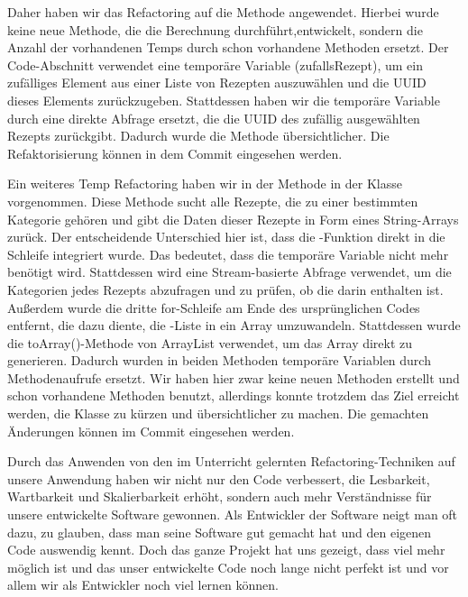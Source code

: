 Daher haben wir das Refactoring auf die Methode  angewendet. Hierbei wurde keine neue Methode, die die Berechnung durchführt,entwickelt, sondern die Anzahl der vorhandenen Temps durch schon vorhandene Methoden ersetzt. Der Code-Abschnitt verwendet eine temporäre Variable (zufallsRezept), um ein zufälliges Element aus einer Liste von Rezepten auszuwählen und die UUID dieses Elements zurückzugeben. Stattdessen haben wir die temporäre Variable durch eine direkte Abfrage ersetzt, die die UUID des zufällig ausgewählten Rezepts zurückgibt. Dadurch wurde die Methode übersichtlicher. Die Refaktorisierung können in dem Commit \href{https://github.com/MichaelaHaag/RezeptApp/commit/4e0bedc859ba644d448fe4c89a3a6e1320519593}{} eingesehen werden. 

Ein weiteres Temp Refactoring haben wir in der Methode  in der Klasse  vorgenommen. Diese Methode sucht alle Rezepte, die zu einer bestimmten Kategorie gehören und gibt die Daten dieser Rezepte in Form eines String-Arrays zurück. Der entscheidende Unterschied hier ist, dass die -Funktion direkt in die Schleife integriert wurde. Das bedeutet, dass die temporäre Variable  nicht mehr benötigt wird. Stattdessen wird eine Stream-basierte Abfrage verwendet, um die Kategorien jedes Rezepts abzufragen und zu prüfen, ob die  darin enthalten ist.
Außerdem wurde die dritte for-Schleife am Ende des ursprünglichen Codes entfernt, die dazu diente, die -Liste in ein Array umzuwandeln. Stattdessen wurde die toArray()-Methode von ArrayList verwendet, um das Array direkt zu generieren. 
Dadurch wurden in beiden Methoden temporäre Variablen durch Methodenaufrufe ersetzt. Wir haben hier zwar keine neuen Methoden erstellt und schon vorhandene Methoden benutzt, allerdings konnte trotzdem das Ziel erreicht werden, die Klasse zu kürzen und übersichtlicher zu machen. Die gemachten Änderungen können im Commit \href{https://github.com/MichaelaHaag/RezeptApp/commit/4e0bedc859ba644d448fe4c89a3a6e1320519593}{} eingesehen werden. 

Durch das Anwenden von den im Unterricht gelernten Refactoring-Techniken auf unsere Anwendung haben wir nicht nur den Code verbessert, die Lesbarkeit, Wartbarkeit und Skalierbarkeit erhöht, sondern auch mehr Verständnisse für unsere entwickelte Software gewonnen. Als Entwickler der Software neigt man oft dazu, zu glauben, dass man seine Software gut gemacht hat und den eigenen Code auswendig kennt. Doch das ganze Projekt hat uns gezeigt, dass viel mehr möglich ist und das unser entwickelte Code noch lange nicht perfekt ist und vor allem wir als Entwickler noch viel lernen können. 